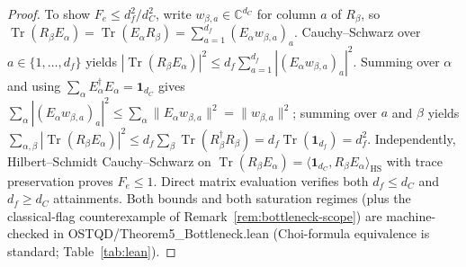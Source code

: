 \documentclass[11pt,a4paper]{article}
\theoremstyle{definition}
\theoremstyle{remark}
\newcommand{\Tr}{\operatorname{Tr}}
\newcommand{\bbC}{\mathbb{C}}
\newcommand{\1}{\mathbf{1}}
\newcommand{\code}[1]{{\footnotesize\ttfamily #1}}
\begin{document}
\begin{proof}
To show $F_e \le d_f^2/d_C^2$, write $w_{\beta,a} \in \bbC^{d_C}$ for column $a$ of $R_\beta$, so $\Tr(R_\beta E_\alpha) = \Tr(E_\alpha R_\beta) = \sum_{a=1}^{d_f}(E_\alpha w_{\beta,a})_a$. Cauchy--Schwarz over $a \in \{1,\dots,d_f\}$ yields $|\Tr(R_\beta E_\alpha)|^2 \le d_f \sum_{a=1}^{d_f} |(E_\alpha w_{\beta,a})_a|^2$. Summing over $\alpha$ and using $\sum_\alpha E_\alpha^\dagger E_\alpha = \1_{d_C}$ gives $\sum_\alpha |(E_\alpha w_{\beta,a})_a|^2 \le \sum_\alpha \|E_\alpha w_{\beta,a}\|^2 = \|w_{\beta,a}\|^2$; summing over $a$ and $\beta$ yields $\sum_{\alpha,\beta}|\Tr(R_\beta E_\alpha)|^2 \le d_f \sum_\beta \Tr(R_\beta^\dagger R_\beta) = d_f\Tr(\1_{d_f}) = d_f^2$. Independently, Hilbert--Schmidt Cauchy--Schwarz on $\Tr(R_\beta E_\alpha) = \langle \1_{d_C}, R_\beta E_\alpha\rangle_{\mathrm{HS}}$ with trace preservation proves $F_e \le 1$. Direct matrix evaluation verifies both $d_f \le d_C$ and $d_f \ge d_C$ attainments. Both bounds and both saturation regimes (plus the classical-flag counterexample of Remark~\ref{rem:bottleneck-scope}) are machine-checked in \code{OSTQD/Theorem5\_Bottleneck.lean} (Choi-formula equivalence is standard; Table~\ref{tab:lean}).
\end{proof}
\end{document}
